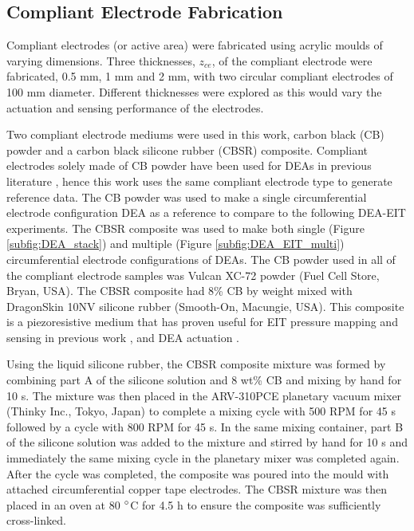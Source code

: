 \subsection{Compliant Electrode Fabrication}
\label{subsec:dea_elec_fab}
Compliant electrodes (or active area) were fabricated using acrylic moulds of varying dimensions. Three thicknesses, $z_{ce}$, of the compliant electrode were fabricated, 0.5 mm, 1 mm and 2 mm, with two circular compliant electrodes of 100 mm diameter. Different thicknesses were explored as this would vary the actuation and sensing performance of the electrodes.

Two compliant electrode mediums were used in this work, carbon black (CB) powder and a carbon black silicone rubber (CBSR) composite. Compliant electrodes solely made of CB powder have been used for DEAs in previous literature\cite{Carpi2015, Huang2022, Shigemune2018} , hence this work uses the same compliant electrode type to generate reference data. The CB powder was used to make a single circumferential electrode configuration DEA as a reference to compare to the following DEA-EIT experiments. The CBSR composite was used to make both single (Figure \ref{subfig:DEA_stack}) and multiple (Figure \ref{subfig:DEA_EIT_multi}) circumferential electrode configurations of DEAs. The CB powder used in all of the compliant electrode samples was Vulcan XC-72 powder (Fuel Cell Store, Bryan, USA). The CBSR composite had 8\% CB by weight mixed with DragonSkin 10NV silicone rubber (Smooth-On, Macungie, USA). This composite is a piezoresistive medium that has proven useful for EIT pressure mapping and sensing in previous work\cite{Ellingham2024} , and DEA actuation\cite{Carpi2015, Huang2022} .

Using the liquid silicone rubber, the CBSR composite mixture was formed by combining part A of the silicone solution and 8 wt\% CB and mixing by hand for 10 s. The mixture was then placed in the ARV-310PCE planetary vacuum mixer (Thinky Inc., Tokyo, Japan) to complete a mixing cycle with 500 RPM for 45 s followed by a cycle with 800 RPM for 45 s. In the same mixing container, part B of the silicone solution was added to the mixture and stirred by hand for 10 s and immediately the same mixing cycle in the planetary mixer was completed again. After the cycle was completed, the composite was poured into the mould with attached circumferential copper tape electrodes. The CBSR mixture was then placed in an oven at 80 $\degree$C for 4.5 h to ensure the composite was sufficiently cross-linked.


